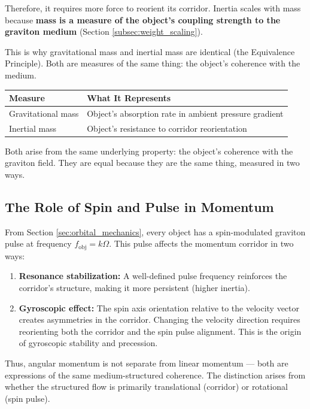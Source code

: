 \documentclass[12pt, a4paper]{article}
\begin{document}
Therefore, it requires more force to reorient its corridor. Inertia scales with mass because \textbf{mass is a measure of the object's coupling strength to the graviton medium} (Section \ref{subsec:weight_scaling}).

This is why gravitational mass and inertial mass are identical (the Equivalence Principle). Both are measures of the same thing: the object's coherence with the medium.

\begin{center}
\begin{tabular}{|p{4cm}|p{10cm}|}
\hline
\textbf{Measure} & \textbf{What It Represents} \\
\hline
Gravitational mass & Object's absorption rate in ambient pressure gradient \\
\hline
Inertial mass & Object's resistance to corridor reorientation \\
\hline
\end{tabular}
\end{center}

Both arise from the same underlying property: the object's coherence with the graviton field. They are equal because they are the same thing, measured in two ways.

\subsection{The Role of Spin and Pulse in Momentum}
\label{subsec:spin_momentum}

From Section \ref{sec:orbital_mechanics}, every object has a spin-modulated graviton pulse at frequency \( f_{\text{obj}} = k\Omega \). This pulse affects the momentum corridor in two ways:

\begin{enumerate}
    \item \textbf{Resonance stabilization:} A well-defined pulse frequency reinforces the corridor's structure, making it more persistent (higher inertia).
    \item \textbf{Gyroscopic effect:} The spin axis orientation relative to the velocity vector creates asymmetries in the corridor. Changing the velocity direction requires reorienting both the corridor and the spin pulse alignment. This is the origin of gyroscopic stability and precession.
\end{enumerate}

Thus, angular momentum is not separate from linear momentum — both are expressions of the same medium-structured coherence. The distinction arises from whether the structured flow is primarily translational (corridor) or rotational (spin pulse).
\end{document}
